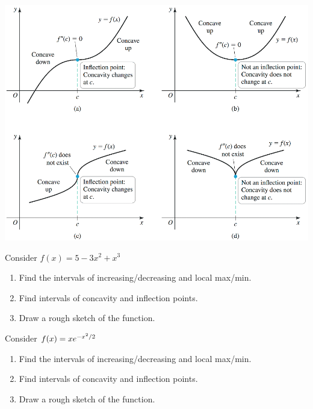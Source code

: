 \documentclass[answers]{exam}
\begin{document}
\begin{center}
  \includegraphics[width=0.925\linewidth]{images/briggs_04_03/fig4_35.png}
\end{center}
\pagebreak

\noindent
{}
\begin{ex*}
  Consider $f(x)=5-3x^2+x^3$
\end{ex*}
\begin{enumerate}[itemsep=\stretch{1}, label=\alph*)]
  \item Find the intervals of increasing/decreasing and local max/min.
  \item Find intervals of concavity and inflection points.
  \item Draw a rough sketch of the function.
\end{enumerate}
\pagebreak

\begin{ex*}
  Consider $f(x)=xe\inv[x^2/2]$
\end{ex*}
\begin{enumerate}[itemsep=\stretch{1}, label=\alph*)]
  \item Find the intervals of increasing/decreasing and local max/min.
  \item Find intervals of concavity and inflection points.
  \item Draw a rough sketch of the function.
\end{enumerate}
\pagebreak
\end{document}
